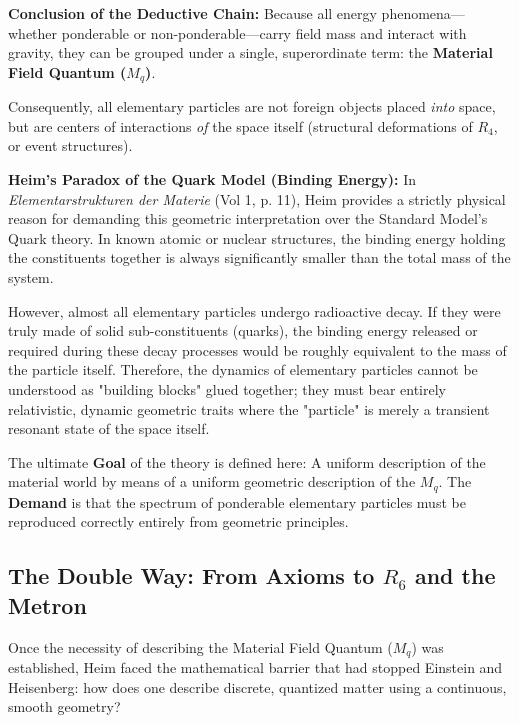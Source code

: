 \documentclass[11pt,a4paper,oneside]{article}
\begin{document}
\textbf{Conclusion of the Deductive Chain:} Because all energy phenomena—whether ponderable or non-ponderable—carry field mass and interact with gravity, they can be grouped under a single, superordinate term: the \textbf{Material Field Quantum ($M_q$)}. 

Consequently, all elementary particles are not foreign objects placed \textit{into} space, but are centers of interactions \textit{of} the space itself (structural deformations of $R_4$, or event structures).

\begin{mbbcite}
    \textbf{Heim's Paradox of the Quark Model (Binding Energy):}
    In \textit{Elementarstrukturen der Materie} (Vol 1, p. 11), Heim provides a strictly physical reason for demanding this geometric interpretation over the Standard Model's Quark theory. In known atomic or nuclear structures, the binding energy holding the constituents together is always significantly smaller than the total mass of the system. 
    
    However, almost all elementary particles undergo radioactive decay. If they were truly made of solid sub-constituents (quarks), the binding energy released or required during these decay processes would be roughly equivalent to the mass of the particle itself. Therefore, the dynamics of elementary particles cannot be understood as "building blocks" glued together; they must bear entirely relativistic, dynamic geometric traits where the "particle" is merely a transient resonant state of the space itself.
\end{mbbcite}

The ultimate \textbf{Goal} of the theory is defined here: A uniform description of the material world by means of a uniform geometric description of the $M_q$. The \textbf{Demand} is that the spectrum of ponderable elementary particles must be reproduced correctly entirely from geometric principles.

\subsection{The Double Way: From Axioms to \texorpdfstring{$R_6$}{R6} and the Metron}
\label{sec:double_way}

Once the necessity of describing the Material Field Quantum ($M_q$) was established, Heim faced the mathematical barrier that had stopped Einstein and Heisenberg: how does one describe discrete, quantized matter using a continuous, smooth geometry? 
\end{document}
